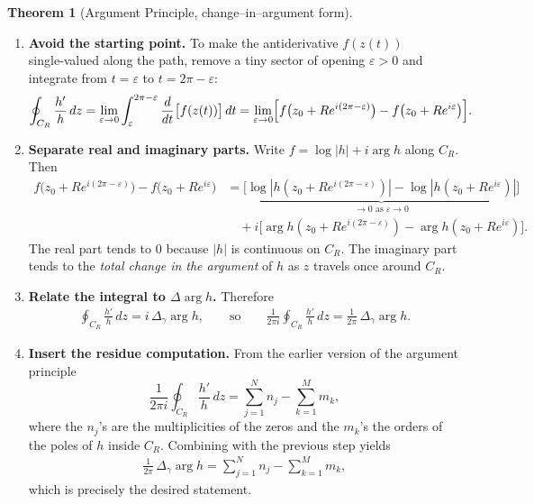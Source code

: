 \documentclass[12pt]{article}
\theoremstyle{definition} %
\newtheorem{theorem}{Theorem}
\theoremstyle{plain} %
\begin{document}
\begin{theorem}[Argument Principle, change--in--argument form]
\begin{enumerate}
        \item\textbf{Avoid the starting point.}
              To make the antiderivative $f(z(t))$ single‑valued along the path,
              remove a tiny sector of opening $\varepsilon>0$ and integrate from $t=\varepsilon$
              to $t=2\pi-\varepsilon$:
              \begin{align}
                  \oint_{C_R}\frac{h'}{h}\,dz
                  =\lim_{\varepsilon\to0}
                  \int_{\varepsilon}^{2\pi-\varepsilon}\frac{d}{dt}\bigl[f(z(t))\bigr]\,dt
                  =\lim_{\varepsilon\to0}\Bigl[f\bigl(z_0+Re^{i(2\pi-\varepsilon)}\bigr)-f\bigl(z_0+Re^{i\varepsilon}\bigr)\Bigr].
              \end{align}

        \item\textbf{Separate real and imaginary parts.}
              Write $f=\log|h|+i\arg h$ along $C_R$.  Then
              \begin{align}
                  f\bigl(z_0+Re^{i(2\pi-\varepsilon)}\bigr)-f\bigl(z_0+Re^{i\varepsilon}\bigr)
                  &=\underbrace{\bigl[\log|h(z_0+Re^{i(2\pi-\varepsilon)})|-\log|h(z_0+Re^{i\varepsilon})|\bigr]}_{\to 0\text{ as }\varepsilon\to0}\\
                  &\quad+i\bigl[\arg h(z_0+Re^{i(2\pi-\varepsilon)})-\arg h(z_0+Re^{i\varepsilon})\bigr].
              \end{align}
              The real part tends to $0$ because $|h|$ is continuous on $C_R$.
              The imaginary part tends to the \emph{total change in the argument}
              of $h$ as $z$ travels once around $C_R$.

        \item\textbf{Relate the integral to $\Delta\arg h$.}
              Therefore
              \begin{align}
                  \oint_{C_R}\frac{h'}{h}\,dz
                  = i\,\Delta_{\gamma}\arg h,
                  \qquad\text{so}\qquad
                  \frac{1}{2\pi i}\oint_{C_R}\frac{h'}{h}\,dz
                  =\frac{1}{2\pi}\,\Delta_{\gamma}\arg h.
              \end{align}

        \item\textbf{Insert the residue computation.}
              From the earlier version of the argument principle
              \[
                  \frac{1}{2\pi i}\oint_{C_R}\frac{h'}{h}\,dz
                  =\sum_{j=1}^{N}n_j-\sum_{k=1}^{M}m_k,
              \]
              where the $n_j$’s are the multiplicities of the zeros
              and the $m_k$’s the orders of the poles of $h$ inside $C_R$.
              Combining with the previous step yields
              \begin{align}
                  \frac{1}{2\pi}\,\Delta_{\gamma}\arg h
                  =\sum_{j=1}^{N}n_j-\sum_{k=1}^{M}m_k,
              \end{align}
              which is precisely the desired statement.
    \end{enumerate}
\end{theorem}
\end{document}
